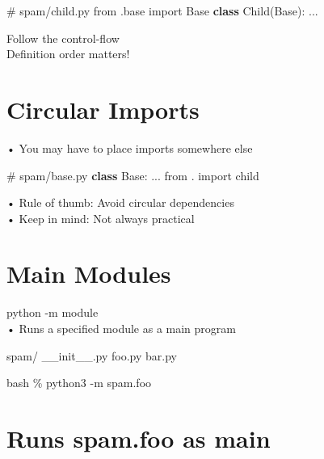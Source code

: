 \documentclass[
  letterpaper,
  DIV=11,
  numbers=noendperiod]{scrreprt}
\newenvironment{Shaded}{\begin{snugshade}}{\end{snugshade}}
\newcommand{\CommentTok}[1]{\textcolor[rgb]{0.37,0.37,0.37}{#1}}
\newcommand{\ImportTok}[1]{\textcolor[rgb]{0.00,0.46,0.62}{#1}}
\newcommand{\KeywordTok}[1]{\textcolor[rgb]{0.00,0.23,0.31}{\textbf{#1}}}
\newcommand{\NormalTok}[1]{\textcolor[rgb]{0.00,0.23,0.31}{#1}}
\begin{document}
\begin{Shaded}
\begin{Highlighting}[]
\CommentTok{\# spam/child.py}
\ImportTok{from}\NormalTok{ .base }\ImportTok{import}\NormalTok{ Base}
\KeywordTok{class}\NormalTok{ Child(Base):}
\NormalTok{    ... }
\end{Highlighting}
\end{Shaded}

Follow the control-flow\\
Definition order matters!


\chapter{Circular Imports}\label{circular-imports-1}

• You may have to place imports somewhere else

\begin{Shaded}
\begin{Highlighting}[]
\CommentTok{\# spam/base.py}
\KeywordTok{class}\NormalTok{ Base:}
\NormalTok{...}
\ImportTok{from}\NormalTok{ . }\ImportTok{import}\NormalTok{ child }
\end{Highlighting}
\end{Shaded}

• Rule of thumb: Avoid circular dependencies\\
• Keep in mind: Not always practical


\chapter{Main Modules}\label{main-modules}

python -m module\\
• Runs a specified module as a main program

\begin{Shaded}
\begin{Highlighting}[]
\NormalTok{spam/ \_\_init\_\_.py foo.py bar.py }
\end{Highlighting}
\end{Shaded}

bash \% python3 -m spam.foo


\chapter{Runs spam.foo as main}\label{runs-spam.foo-as-main}
\end{document}
